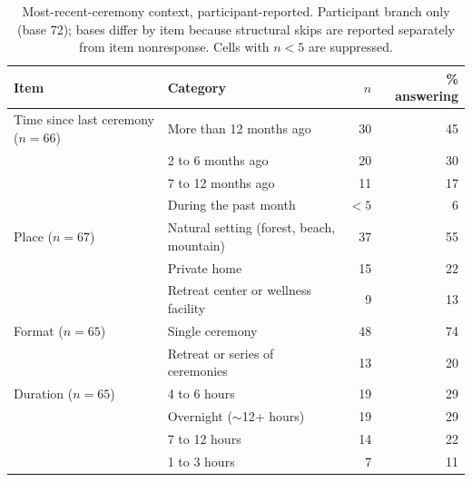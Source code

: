 \documentclass[12pt]{article}
\begin{document}
\begin{table}[htbp]
\centering
\caption{Most-recent-ceremony context, participant-reported. Participant branch only (base 72); bases
differ by item because structural skips are reported separately from item nonresponse. Cells with $n<5$ are
suppressed.}
\label{tab:context}
\begin{tabular}{p{4.2cm}p{5.8cm}rr}
\toprule
Item & Category & $n$ & \% answering \\
\midrule
Time since last ceremony ($n=66$) & More than 12 months ago & 30 & 45 \\
                                  & 2 to 6 months ago & 20 & 30 \\
                                  & 7 to 12 months ago & 11 & 17 \\
                                  & During the past month & $<5$ & 6 \\
\addlinespace
Place ($n=67$)   & Natural setting (forest, beach, mountain) & 37 & 55 \\
                 & Private home & 15 & 22 \\
                 & Retreat center or wellness facility & 9 & 13 \\
\addlinespace
Format ($n=65$)  & Single ceremony & 48 & 74 \\
                 & Retreat or series of ceremonies & 13 & 20 \\
\addlinespace
Duration ($n=65$) & 4 to 6 hours & 19 & 29 \\
                 & Overnight ($\sim$12+ hours) & 19 & 29 \\
                 & 7 to 12 hours & 14 & 22 \\
                 & 1 to 3 hours & 7 & 11 \\
\bottomrule
\end{tabular}
\end{table}
\end{document}
